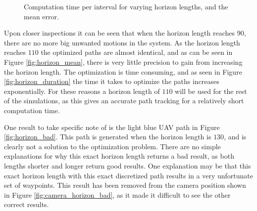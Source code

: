 \begin{figure}
	\caption{Computation time per interval for varying horizon lengths, and the mean error.}
\end{figure}

Upon closer inspections it can be seen that when the horizon length reaches $90$, there are no more big unwanted motions in the system. As the horizon length reaches $110$ the optimized paths are almost identical, and as can be seen in Figure \ref{fig:horizon_mean}, there is very little precision to gain from increasing the horizon length. The optimization is time consuming, and as seen in Figure \ref{fig:horizon_duration} the time it takes to optimize the paths increases exponentially. For these reasons a horizon length of $110$ will be used for the rest of the simulations, as this gives an accurate path tracking for a relatively short computation time.

One result to take specific note of is the light blue UAV path in Figure \ref{fig:horizon_bad}. This path is generated when the horizon length is $130$, and is clearly not a solution to the optimization problem. There are no simple explanations for why this exact horizon length returns a bad result, as both lengths shorter and longer return good results. One explanation may be that this exact horizon length with this exact discretized path results in a very unfortunate set of waypoints. This result has been removed from the camera position shown in Figure \ref{fig:camera_horizon_bad}, as it made it difficult to see the other correct results.